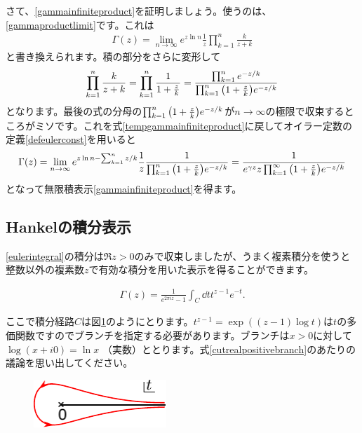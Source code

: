 \documentclass[report,paper=a4, fontsize=12pt, line_length=16cm, number_of_lines=33,dvipdfmx]{jlreq}
\newenvironment{important}{\begin{tcolorbox}[
  colback = white,
  colframe = red!35,
  boxrule = 2mm,
  fonttitle = \bfseries,
  after = \noindent] }{\end{tcolorbox}}
\numberwithin{equation}{section}
\begin{document}
さて、\eqref{gammainfiniteproduct}を証明しましょう。使うのは、\eqref{gammaproductlimit}です。これは
\begin{align}
  \Gamma(z)=\lim_{n\to\infty}e^{z\ln n}\frac{1}{z}
  \prod_{k=1}^{n}\frac{k}{z+k}\label{tempgammainfiniteproduct}
\end{align}
と書き換えられます。積の部分をさらに変形して
\begin{align}
  \prod_{k=1}^{n}\frac{k}{z+k}=\prod_{k=1}^{n}\frac{1}{1+\frac{z}{k}}=\frac{\prod_{k=1}^{n}e^{-z/k}}{\prod_{k=1}^{n}\qty(1+\frac{z}{k})e^{-z/k}}
\end{align}
となります。最後の式の分母の$\prod_{k=1}^{n}\qty(1+\frac{z}{k})e^{-z/k}$が$n\to\infty$の極限で収束するところがミソです。これを式\eqref{tempgammainfiniteproduct}に戻してオイラー定数の定義\eqref{defeulerconst}を用いると
\begin{align}
  \Gamma(z)=\lim_{n\to\infty}e^{z\ln n-\sum_{k=1}^n z/k}\frac{1}{z}
  \frac{1}{\prod_{k=1}^{n}\qty(1+\frac{z}{k})e^{-z/k}}
  =\frac{1}{e^{\gamma z}z \prod_{k=1}^{\infty}\qty(1+\frac{z}{k})e^{-z/k} }
\end{align}
となって無限積表示\eqref{gammainfiniteproduct}を得ます。


\subsection{Hankelの積分表示}
\eqref{eulerintegral}の積分は$\Re z>0$のみで収束しましたが、うまく複素積分を使うと整数以外の複素数$z$で有効な積分を用いた表示を得ることができます。
\begin{important}
  \begin{align}
    \Gamma(z)=\frac{1}{e^{2\pi i z}-1}\int_{C}\dd{t}t^{z-1}e^{-t}.\label{hankelintegral}
  \end{align}
\end{important}
ここで積分経路$C$は図\ref{fig:hankel}のようにとります。$t^{z-1}=\exp((z-1)\log t)$は$t$の多価関数ですのでブランチを指定する必要があります。ブランチは$x>0$に対して$\log(x+i0)=\ln x$ （実数）ととります。式\eqref{cutrealpositivebranch}のあたりの議論を思い出してください。
\begin{figure}[htbp]
  \centering
  \includegraphics[width=5cm]{hankel.pdf}
  \caption{}
  \label{fig:hankel}
\end{figure}
\end{document}
